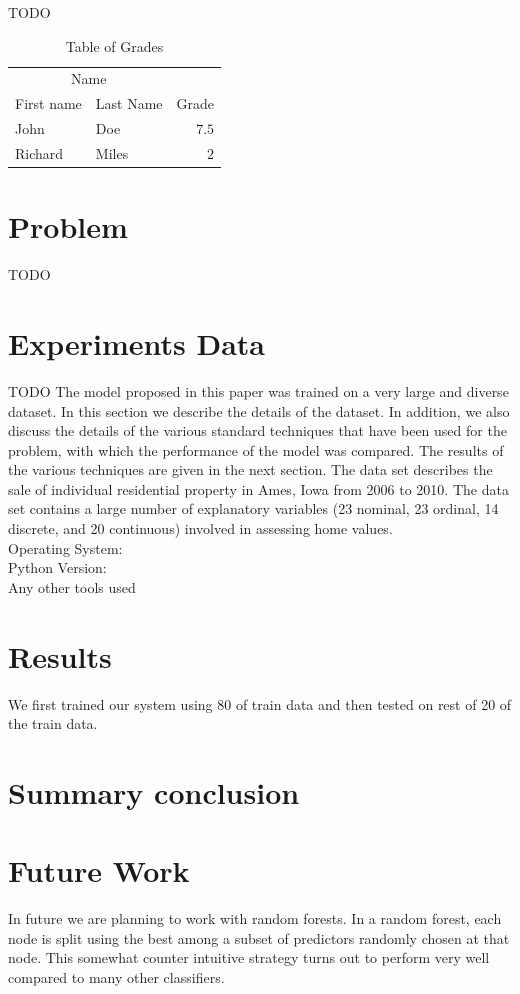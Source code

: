 \documentclass[fleqn,10pt]{SelfArx} %
\begin{document}
	TODO 
	
	\begin{table}[hbt]
		\caption{Table of Grades}
		\centering
		\begin{tabular}{llr}
			\toprule
			\multicolumn{2}{c}{Name} \\
			\cmidrule(r){1-2}
			First name & Last Name & Grade \\
			\midrule
			John & Doe & $7.5$ \\
			Richard & Miles & $2$ \\
			\bottomrule
		\end{tabular}
		\label{tab:label}
	\end{table}
	
	\section{Problem}
	TODO
	
	
	\section{Experiments Data}
	TODO
	The model proposed in this paper was trained on a very
	large and diverse dataset. In this section we describe the
	details of the dataset. In addition, we also discuss the details
	of the various standard techniques that have been used for
	the problem, with which the performance of the model was
	compared. The results of the various techniques are given
	in the next section. The data set describes the sale of individual residential property in Ames, Iowa from 2006 to 2010. The data set contains a large number of explanatory variables (23 nominal, 23 ordinal, 14 discrete, and 20 continuous) involved in assessing home
	values.\\
	Operating System: \\
	Python Version: \\
	Any other tools used \\
	
	
	
	
	\section{Results}
	We first trained our system using 80 of train data and then tested on rest of 20 of the train data. 
	\section{Summary conclusion}
	\section{Future Work}
	In future we are planning to work with random forests. In a random forest, each node is split using the best among a subset of predictors randomly chosen at that node. This somewhat counter intuitive strategy turns out to perform very well compared to many other classifiers.
\end{document}
